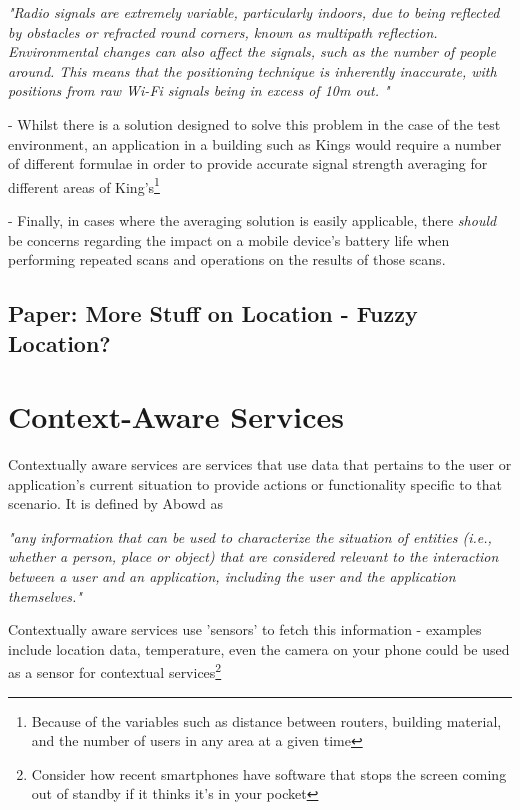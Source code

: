 \documentclass[11pt]{informatics-report}
\begin{document}
\textit{"Radio signals are extremely variable, particularly indoors, due to being reflected by obstacles or refracted round corners, known as multipath reflection. Environmental changes can also affect the signals, such as the number of people around. This means that the positioning technique is inherently inaccurate, with positions from raw Wi-Fi signals being in excess of 10m out. "}\cite{cook2005indoor}

\noindent- Whilst there is a solution designed to solve this problem in the case of the test environment, an application in a building such as Kings would require a number of different formulae in order to provide accurate signal strength averaging for different areas of King's\footnote{ Because of the variables such as distance between routers, building material, and the number of users in any area at a given time}

\noindent- Finally, in cases where the averaging solution is easily applicable, there \textit{should} be concerns regarding the impact on a mobile device's battery life when performing repeated scans and operations on the results of those scans.

\subsection{Paper: More Stuff on Location - Fuzzy Location?} 

\section{Context-Aware Services}

Contextually aware services are services that use data that pertains to the user or application's current situation to provide actions or functionality specific to that scenario. It is defined by Abowd as 

\textit{ "any information that can be used to characterize the situation of entities (i.e., whether a person, place or object) that are considered relevant to the interaction between a user and an application, including the user and the application themselves." }\cite{abowd1999towards}

Contextually aware services use 'sensors' to fetch this information - examples include location data, temperature, even the camera on your phone could be used as a sensor for contextual services\footnote{Consider how recent smartphones have software that stops the screen coming out of standby if it thinks it's in your pocket}
\end{document}
